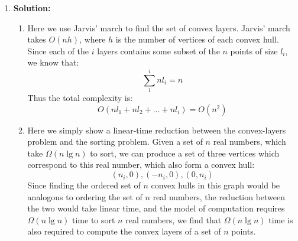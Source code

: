 \documentclass{article}
\begin{document}
\begin{enumerate}
    \item \textbf{Solution:}
    \begin{enumerate}
        \item{} Here we use Jarvis' march to find the set of convex layers.
        Jarvis' march takes $O(nh)$, where $h$ is the number of vertices of each
        convex hull. Since each of the $i$ layers contains some subset of the
        $n$ points of size $l_i$, we know that:
        $$ \sum_{1}^{i}{nl_i} = n$$
        Thus the total complexity is:
        $$ O(nl_1 + nl_2 + \ldots + nl_i) = O(n^2) $$
        \item{} Here we simply show a linear-time reduction between the
        convex-layers problem and the sorting problem. Given a set of $n$ real
        numbers, which take $\Omega(n\lg{n})$ to sort, we can produce a set of three
        vertices which correspond to this real number, which also form a convex
        hull:
        $$ (n_i, 0), (-n_i, 0), (0, n_i) $$
        Since finding the ordered set of $n$ convex hulls in this graph would be
        analogous to ordering the set of $n$ real numbers, the reduction between
        the two would take linear time, and the model of computation requires
        $\Omega(n\lg{n})$ time to sort $n$ real numbers, we find that
        $\Omega(n\lg{n})$ time is also required to compute the convex layers of
        a set of $n$ points.
    \end{enumerate}
\end{enumerate}
\end{document}
